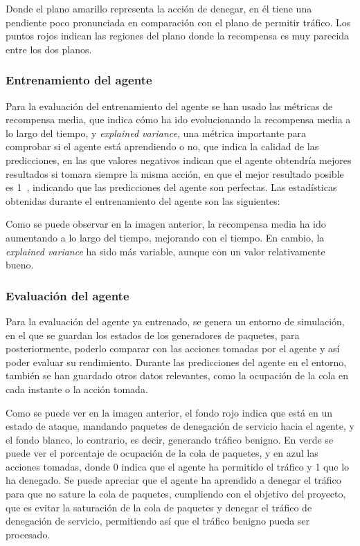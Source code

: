 Donde el plano amarillo representa la acción de denegar, en él tiene una pendiente poco pronunciada en comparación con el plano de permitir  tráfico.
Los puntos rojos indican las regiones del plano donde la recompensa es muy parecida entre los dos planos.

\subsubsection{Entrenamiento del agente}
Para la evaluación del entrenamiento del agente se han usado las métricas de recompensa media, que indica cómo ha ido evolucionando la recompensa media a lo largo del tiempo, y \textit{explained variance}, una métrica importante para comprobar si el agente está aprendiendo o no, que indica la calidad de las predicciones, en las que valores negativos indican que el agente obtendría mejores resultados si tomara siempre la misma acción, en que el mejor resultado posible es 1~\cite{JonathanHui2023}, indicando que las predicciones del agente son perfectas. 
Las estadísticas obtenidas durante el entrenamiento del agente son las siguientes:


Como se puede observar en la imagen anterior, la recompensa media ha ido aumentando a lo largo del tiempo, mejorando con el tiempo. En cambio, la \textit{explained variance} ha sido más variable, aunque con un valor relativamente bueno.

\subsubsection{Evaluación del agente}
Para la evaluación del agente ya entrenado, se genera un entorno de simulación, en el que se guardan los estados de los generadores de paquetes, para posteriormente, poderlo comparar con las acciones tomadas por el agente y así poder evaluar su rendimiento.
Durante las predicciones del agente en el entorno, también se han guardado otros datos relevantes, como la ocupación de la cola en cada instante o la acción tomada.


Como se puede ver en la imagen anterior, el fondo rojo indica que está en un estado de ataque, mandando paquetes de denegación de servicio hacia el agente, y el fondo blanco, lo contrario, es decir, generando tráfico benigno. En verde se puede ver el porcentaje de ocupación de la cola de paquetes, y en azul las acciones tomadas, donde 0 indica que el agente ha permitido el tráfico y 1 que lo ha denegado. Se puede apreciar que el agente ha aprendido a denegar el tráfico para que no sature la cola de paquetes, cumpliendo con el objetivo del proyecto, que es evitar la saturación de la cola de paquetes y denegar el tráfico de denegación de servicio, permitiendo así que el tráfico benigno pueda ser procesado.

